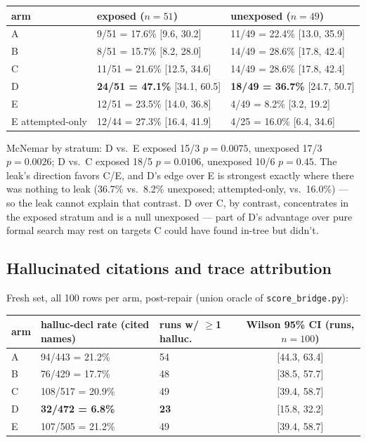\documentclass[10pt]{article}
\newcommand{\code}[1]{\texttt{#1}}
\newcommand{\best}[1]{\textbf{#1}}
\begin{document}
\begin{center}
\footnotesize
\begin{tabular}{@{}lll@{}}
\toprule
arm & exposed ($n=51$) & unexposed ($n=49$) \\
\midrule
A & 9/51 = 17.6\% [9.6, 30.2] & 11/49 = 22.4\% [13.0, 35.9] \\
B & 8/51 = 15.7\% [8.2, 28.0] & 14/49 = 28.6\% [17.8, 42.4] \\
C & 11/51 = 21.6\% [12.5, 34.6] & 14/49 = 28.6\% [17.8, 42.4] \\
D & \best{24/51 = 47.1\%} [34.1, 60.5] & \best{18/49 = 36.7\%} [24.7, 50.7] \\
E & 12/51 = 23.5\% [14.0, 36.8] & 4/49 = 8.2\% [3.2, 19.2] \\
E attempted-only & 12/44 = 27.3\% [16.4, 41.9] & 4/25 = 16.0\% [6.4, 34.6] \\
\bottomrule
\end{tabular}
\end{center}

McNemar by stratum: D vs.\ E exposed 15/3 $p=0.0075$, unexposed 17/3
$p=0.0026$; D vs.\ C exposed 18/5 $p=0.0106$, unexposed 10/6 $p=0.45$.
The leak's direction favors C/E, and D's edge over E is strongest exactly
where there was nothing to leak (36.7\% vs.\ 8.2\% unexposed;
attempted-only, vs.\ 16.0\%) --- so the leak cannot explain that contrast.
D over C, by contrast, concentrates in the exposed stratum and is a null
unexposed --- part of D's advantage over pure formal search may rest on
targets C could have found in-tree but didn't.

\subsection{Hallucinated citations and trace attribution}\label{sec:halluc}

Fresh set, all 100 rows per arm, post-repair (union oracle of
\code{score\_bridge.py}):

\begin{center}
\footnotesize
\begin{tabular}{@{}lllc@{}}
\toprule
arm & halluc-decl rate (cited names) & runs w/ $\geq$1 halluc. & Wilson 95\% CI (runs, $n=100$) \\
\midrule
A & 94/443 = 21.2\% & 54 & [44.3, 63.4] \\
B & 76/429 = 17.7\% & 48 & [38.5, 57.7] \\
C & 108/517 = 20.9\% & 49 & [39.4, 58.7] \\
D & \best{32/472 = 6.8\%} & \best{23} & [15.8, 32.2] \\
E & 107/505 = 21.2\% & 49 & [39.4, 58.7] \\
\bottomrule
\end{tabular}
\end{center}
\end{document}
